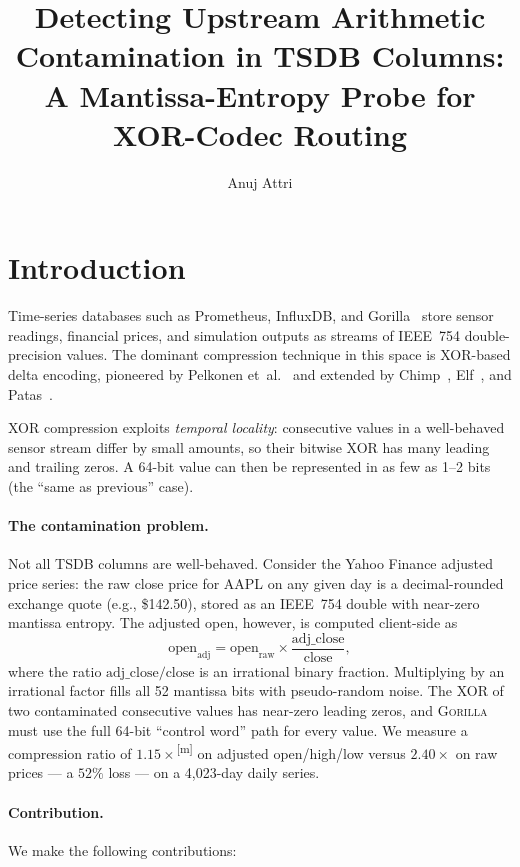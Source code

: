 \documentclass[sigconf]{acmart}
\title{%
  Detecting Upstream Arithmetic Contamination in TSDB Columns:\\
  A Mantissa-Entropy Probe for XOR-Codec Routing
}
\author{Anuj Attri}
\affiliation{\institution{Independent Researcher}}
\newcommand{\gorilla}{\textsc{Gorilla}\xspace}
\newcommand{\measured}{\textsuperscript{[m]}\xspace}
\begin{document}
\maketitle

\section{Introduction}
\label{sec:intro}

Time-series databases such as Prometheus, InfluxDB, and Gorilla~\cite{Gorilla2015}
store sensor readings, financial prices, and simulation outputs as streams of
IEEE~754 double-precision values.  The dominant compression technique in this
space is XOR-based delta encoding, pioneered by Pelkonen et~al.~\cite{Gorilla2015}
and extended by Chimp~\cite{Chimp2022}, Elf~\cite{Elf2023}, and
Patas~\cite{Patas2023}.

XOR compression exploits \emph{temporal locality}: consecutive values in a
well-behaved sensor stream differ by small amounts, so their bitwise XOR has
many leading and trailing zeros.  A 64-bit value can then be represented in
as few as 1--2 bits (the ``same as previous'' case).

\paragraph{The contamination problem.}
Not all TSDB columns are well-behaved.  Consider the Yahoo Finance adjusted
price series: the raw close price for AAPL on any given day is a
decimal-rounded exchange quote (e.g., \$142.50), stored as an IEEE~754
double with near-zero mantissa entropy.  The adjusted open, however, is
computed client-side as
\[
  \text{open}_{\text{adj}} = \text{open}_{\text{raw}} \times
  \frac{\text{adj\_close}}{\text{close}},
\]
where the ratio $\text{adj\_close} / \text{close}$ is an irrational binary
fraction.  Multiplying by an irrational factor fills all 52 mantissa bits
with pseudo-random noise.  The XOR of two contaminated consecutive values
has near-zero leading zeros, and \gorilla must use the full 64-bit
``control word'' path for every value.  We measure a compression ratio of
$1.15\times$\measured on adjusted open/high/low versus $2.40\times$ on raw
prices — a $52\%$ loss — on a 4,023-day daily series.

\paragraph{Contribution.}
We make the following contributions:
\end{document}
